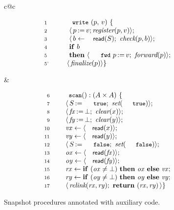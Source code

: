 \documentclass[a4paper,UKenglish]{lipics-v2016}
\newcommand{\asgn}{\leftarrow}
\newcommand{\act}[1]{\textsf{\small{#1}}}
\newcommand{\aux}[1]{\textit{#1}}
\newcommand{\esc}[1]{\text{\texttt{\small{#1}}}}
\newcommand{\kw}[1]{\text{\textbf{#1}}}
\newcommand{\var}[1]{\mathit{#1}}
\newcommand{\num}[1]{{\text{{\scriptsize{#1}}}}}
\def\lat{\langle}
\def\rat{\rangle}
\def\tbnd{\asgn}
\newcommand{\actwrite}[2]{{#1}\,{:=}\,{#2}}
\theoremstyle{definition}
\begin{document}
\begin{figure}[t]
%
\centering
\begin{tabular}{c@{\hfill}c}
%
\begin{minipage}[t]{.5\textwidth}
\[
\begin{array}{ll}
\num{1}~ & ~~ \esc{write}\ (p,\, v)\ \{\\ 
\num{2}~ & ~~~~~ \lat\,\actwrite{p}{v}; \aux{register}(p,v)\rat;\\
\num{3}~ & ~~~~~ \lat\, b \tbnd \act{read}(S);\ \aux{check}(p,b) \rat;\\
\num{4}~ & ~~~~~ \kw{if}\ b\\
\num{5}~ & ~~~~~ \kw{then}\ \lat\,%
                           \actwrite{\aleksfwdp{p}}{v};\ \aux{forward}(p)\rat; \\
\num{5'}~           & ~~~~ \lat\,\aux{finalize}(p)\rat\}
\end{array}
\]
\end{minipage}
%
&
%
\begin{minipage}[t]{.5\textwidth}
\[
\begin{array}{rl}
\num{6}~  & \esc{scan} () : ( A \times A )~ \{ \\ 
\num{7}~  & ~~~ \lat\,\actwrite{\s}{\esc{true}};\ \aux{set}(\esc{true}) \rat;\\  
\num{8}~  & ~~~ \lat\,\actwrite{\fx}{\bot};\ \aux{clear}(\x)\rat;\\
\num{9}~  & ~~~ \lat\,\actwrite{\fy}{\bot};\ \aux{clear}(\y)\rat;\\
\num{10}~ & ~~~ \var{vx} \tbnd \lat \act{read}(\x) \rat ; \\
\num{11}~ & ~~~ \var{vy} \tbnd \lat \act{read}(\y) \rat;  \\
\num{12}~ & ~~~ \lat\,\actwrite{\s}{\esc{false}};\ \aux{set}(\esc{false})\rat;\\
\num{13}~ & ~~~ \var{ox} \tbnd \lat \act{read}(\fx) \rat;\\
\num{14}~ & ~~~ \var{oy} \tbnd \lat \act{read}(\fy) \rat;\\
\num{15}~ & ~~~ \var{rx} \tbnd \kw{if}\ (\var{ox} \neq\bot)\
                \kw{then}\ \var{ox}\ \kw{else}\ \var{vx};\\
\num{16}~ & ~~~ \var{ry} \tbnd \kw{if}\ (\var{oy} \neq\bot)\
                \kw{then}\ \var{oy}\ \kw{else}\ \var{vy};\\
\num{17}~ & ~~~ \lat\,\aux{relink}(\var{rx}, \var{ry});\
                \kw{return}\ (\var{rx}, \var{ry})\,\rat\}
\end{array}
\]
\end{minipage}
%
\end{tabular}
%
\caption{Snapshot procedures annotated with auxiliary code.}
\label{fig:fcsl-snapshot}
\end{figure}
\end{document}
